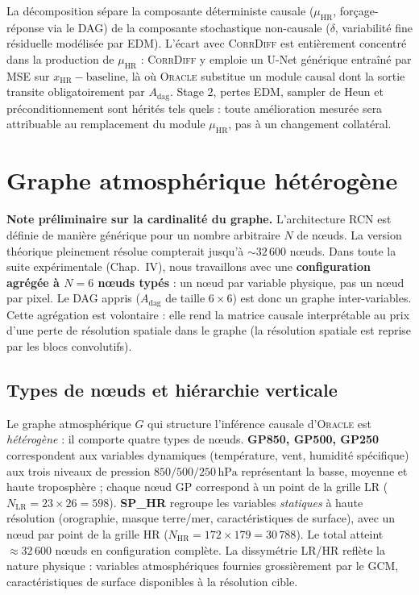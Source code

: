 \documentclass[14pt,a4paper,openany]{extreport}
\theoremstyle{definition}
\newcommand{\Oracle}{\textsc{Oracle}}
\newcommand{\CorrDiff}{\textsc{CorrDiff}}
\newcommand{\LR}{\ensuremath{\text{LR}}}
\newcommand{\HR}{\ensuremath{\text{HR}}}
\newcommand{\xHR}{\ensuremath{x_{\HR}}}
\newcommand{\muHR}{\ensuremath{\mu_{\HR}}}
\newcommand{\Adag}{\ensuremath{A_{\mathrm{dag}}}}
\begin{document}
La décomposition sépare la composante déterministe causale ($\muHR$, forçage-réponse via le DAG) de la composante stochastique non-causale ($\delta$, variabilité fine résiduelle modélisée par EDM). L'écart avec \CorrDiff{} est entièrement concentré dans la production de $\muHR$ : \CorrDiff{} y emploie un U-Net générique entraîné par MSE sur $\xHR - \mathrm{baseline}$, là où \Oracle{} substitue un module causal dont la sortie transite obligatoirement par $\Adag$. Stage 2, pertes EDM, sampler de Heun et préconditionnement sont hérités tels quels : toute amélioration mesurée sera attribuable au remplacement du module $\muHR$, pas à un changement collatéral.

\section{Graphe atmosphérique hétérogène}
\label{sec:oracle-graphe}

\noindent\textbf{Note préliminaire sur la cardinalité du graphe.} L'architecture RCN est définie de manière générique pour un nombre arbitraire $N$ de nœuds. La version théorique pleinement résolue compterait jusqu'à ${\sim}32\,600$ nœuds. Dans toute la suite expérimentale (Chap.~IV), nous travaillons avec une \textbf{configuration agrégée à $N = 6$ nœuds typés} : un nœud par variable physique, pas un nœud par pixel. Le DAG appris ($A_{\mathrm{dag}}$ de taille $6 \times 6$) est donc un graphe inter-variables. Cette agrégation est volontaire : elle rend la matrice causale interprétable au prix d'une perte de résolution spatiale dans le graphe (la résolution spatiale est reprise par les blocs convolutifs).

\subsection{Types de nœuds et hiérarchie verticale}
\label{ssec:oracle-types-noeuds}

Le graphe atmosphérique $G$ qui structure l'inférence causale d'\Oracle{} est \emph{hétérogène} : il comporte quatre types de nœuds. \textbf{GP850, GP500, GP250} correspondent aux variables dynamiques (température, vent, humidité spécifique) aux trois niveaux de pression $850/500/250\,\mathrm{hPa}$ représentant la basse, moyenne et haute troposphère ; chaque nœud GP correspond à un point de la grille LR ($N_{\LR} = 23\times 26 = 598$). \textbf{SP\_HR} regroupe les variables \emph{statiques} à haute résolution (orographie, masque terre/mer, caractéristiques de surface), avec un nœud par point de la grille HR ($N_{\HR} = 172\times 179 = 30\,788$). Le total atteint $\approx 32\,600$ nœuds en configuration complète. La dissymétrie LR/HR reflète la nature physique : variables atmosphériques fournies grossièrement par le GCM, caractéristiques de surface disponibles à la résolution cible.
\end{document}
